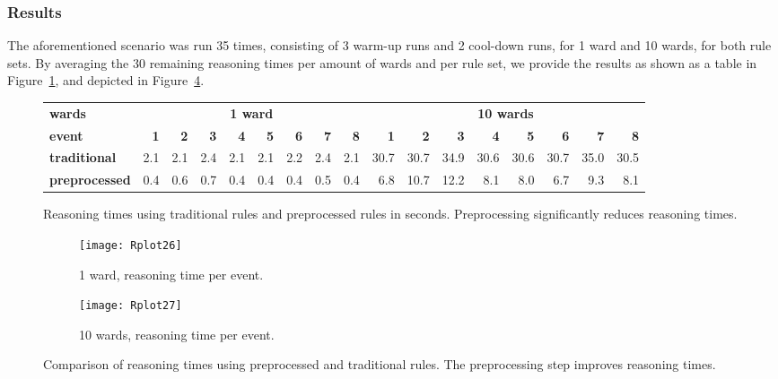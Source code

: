 \subsubsection{Results}
The aforementioned scenario was run 35 times, consisting of 3 warm-up runs and 2 cool-down runs, for 1 ward and 10 wards, for both rule sets.
By averaging the 30 remaining reasoning times per amount of wards and per rule set, we provide the results as shown as a table in Figure~\ref{fig:resultstable}, and depicted in Figure~\ref{figure:results}. 

\begin{figure}  
\begin{center}
\tabcolsep 1.8pt
\def\arraystretch{1.1}
\begin{tabular}[b]{l| rrrrrrrr | rrrrrrrr}
 \hline
 \bf wards&\multicolumn{8}{c|}{\bf 1 ward} & \multicolumn{8}{|c}{\bf 10 wards} \\
 \bf event&\bf1&\bf2&\bf3&\bf4&\bf5&\bf6&\bf7&\bf8&\bf1&\bf2&\bf3&\bf4&\bf5&\bf6&\bf7&\bf8\\ 
  \hline
  \bf traditional 
&2.1&
2.1&
2.4&
2.1&
2.1&
2.2&
2.4&
2.1
 & 30.7&
30.7&
34.9&
30.6&
30.6&
30.7&
35.0&
30.5
\\
  \bf preprocessed &
0.4&
0.6&
0.7&
0.4&
0.4&
0.4&
0.5&
0.4
 & 6.8&
10.7&
12.2&
8.1&
8.0&
6.7&
9.3&
8.1
 \\
  \hline
\end{tabular}
\end{center}
\caption{Reasoning times using traditional rules and preprocessed rules in seconds. Preprocessing significantly reduces reasoning times.}
\label{fig:resultstable}
\end{figure}

% 
%   
  
\begin{figure}
\centering
\begin{subfigure}{.5\textwidth}
  \centering
  \texttt{[image: Rplot26]}
  \caption{1 ward, reasoning time per event.}
  \label{fig:results1ward}
\end{subfigure}%
\begin{subfigure}{.5\textwidth}
  \centering
  \texttt{[image: Rplot27]}
  \caption{10 wards, reasoning time per event.}
  \label{fig:results10ward}
\end{subfigure}
\caption{Comparison of reasoning times using preprocessed and traditional rules. The preprocessing step improves reasoning times.}
\label{figure:results}
\end{figure} 
 


